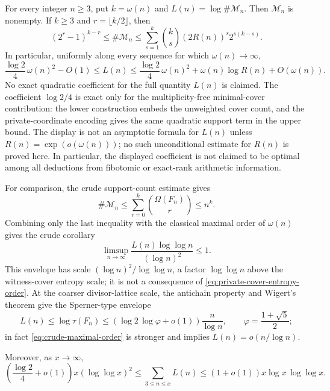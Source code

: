 \begin{theorem}
\label{thm:minimal-generator-growth}
For every integer $n\ge3$, put $k=\omega(n)$ and
$L(n)=\log\#\mathcal M_n$. Then $\mathcal M_n$ is nonempty. If $k\ge3$ and
$r=\lfloor k/2\rfloor$, then
\begin{equation}\label{eq:private-cover-finite-bounds}
 (2^r-1)^{k-r}
 \le \#\mathcal M_n
 \le \sum_{s=1}^{k}\binom{k}{s}(2R(n))^s2^{s(k-s)}.
\end{equation}
In particular, uniformly along every sequence for which $\omega(n)\to\infty$,
\begin{equation}\label{eq:private-cover-entropy-order}
 \frac{\log2}{4}\,\omega(n)^2-O(1)
 \le L(n)
 \le \frac{\log2}{4}\,\omega(n)^2
      +\omega(n)\log R(n)+O(\omega(n)).
\end{equation}
No exact quadratic coefficient for the full quantity $L(n)$ is claimed.
The coefficient $\log2/4$ is exact only for the multiplicity-free
minimal-cover contribution: the lower construction embeds the unweighted
cover count, and the private-coordinate encoding gives the same quadratic
support term in the upper bound. The display is not an asymptotic formula for
$L(n)$ unless $R(n)=\exp(o(\omega(n)))$; no such unconditional estimate for
$R(n)$ is proved here. In particular, the displayed coefficient is not
claimed to be optimal among all deductions from fibotomic or exact-rank
arithmetic information.

For comparison, the crude support-count estimate gives
\begin{equation}
\label{eq:finite-minimal-generator-bound}
 \#\mathcal M_n
 \le \sum_{r=0}^{k}\binom{\Omega(F_n)}{r}
 \le n^k.
\end{equation}
Combining only the last inequality with the classical maximal order of
$\omega(n)$ gives the crude corollary
\begin{equation}
\label{eq:crude-maximal-order}
 \limsup_{n\to\infty}
 \frac{L(n)\log\log n}{(\log n)^2}\le1.
\end{equation}
This envelope has scale $(\log n)^2/\log\log n$, a factor $\log\log n$
above the witness-cover entropy scale; it is not a consequence of
\eqref{eq:private-cover-entropy-order}.
At the coarser divisor-lattice scale, the antichain property and Wigert's
theorem give the Sperner-type envelope
\begin{equation}
\label{eq:sperner-wigert-envelope}
 L(n)\le\log\tau(F_n)
 \le (\log2\,\log\varphi+o(1))\frac{n}{\log n},
 \qquad \varphi=\frac{1+\sqrt5}{2};
\end{equation}
in fact \eqref{eq:crude-maximal-order} is stronger and implies
$L(n)=o(n/\log n)$.

Moreover, as $x\to\infty$,
\begin{equation}
\label{eq:mean-logarithmic-growth}
 \left(\frac{\log2}{4}+o(1)\right)x(\log\log x)^2
 \le \sum_{3\le n\le x}L(n)
 \le (1+o(1))x\log x\,\log\log x.
\end{equation}

\end{theorem}

